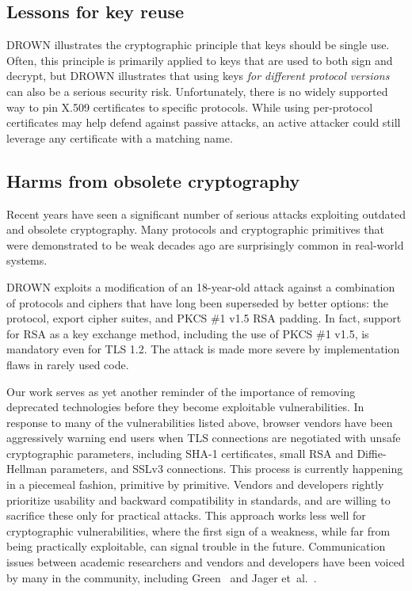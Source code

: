 \subsection{Lessons for key reuse}

DROWN illustrates the cryptographic principle that keys should be single use.
Often, this principle is primarily applied to keys that are used to both sign
and decrypt, but DROWN illustrates that using keys \emph{for different protocol
versions} can also be a serious security risk.
Unfortunately, there is no widely supported way to pin X.509 certificates to specific
protocols. While using per-protocol certificates may help defend against
passive attacks, an active attacker could still leverage any certificate with a
matching name.

\subsection{Harms from obsolete cryptography}

Recent years have seen a significant number of serious attacks exploiting
outdated and obsolete cryptography. Many protocols and cryptographic primitives
that were demonstrated to be weak decades ago are surprisingly common in
real-world systems.


DROWN exploits a modification of an 18-year-old attack against a combination of protocols and ciphers that have long been superseded by better options: the \ssltwo protocol, export cipher suites, and PKCS \#1 v1.5 RSA padding. In fact, support for RSA as a key exchange method, including the use of PKCS \#1 v1.5, is mandatory even for TLS 1.2. The attack is made more severe by implementation flaws in rarely used code.

Our work serves as yet another reminder of the importance of removing
deprecated technologies before they become exploitable vulnerabilities. In
response to many of the vulnerabilities listed above, browser vendors have
been aggressively warning end users when TLS connections are negotiated with
unsafe cryptographic parameters, including SHA-1 certificates, small RSA and
Diffie-Hellman parameters, and SSLv3 connections. This process is currently
happening in a piecemeal fashion, primitive by primitive. Vendors and
developers rightly prioritize usability and backward compatibility in
standards, and are willing to sacrifice these only for practical attacks.
This approach works less well for cryptographic vulnerabilities, where the
first sign of a weakness, while far from being practically exploitable, can
signal trouble in the future. Communication issues between academic
researchers and vendors and developers have been voiced by many in the
community, including Green~\cite{green-2015} and Jager
et~al.\@~\cite{jager-2013}.

